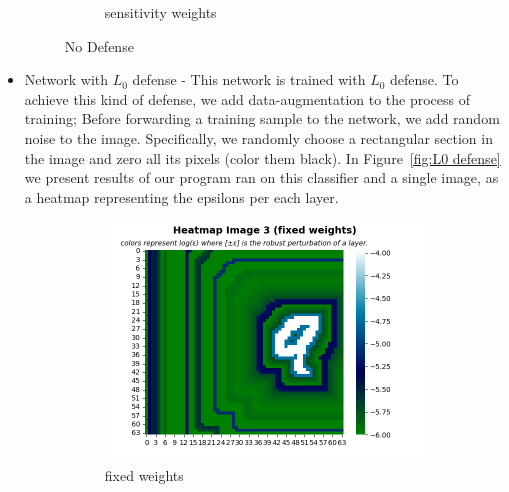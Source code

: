 \begin{itemize}
\begin{figure}
\begin{subfigure}[b]{0.4\textwidth}
             \caption{sensitivity weights}
             \label{sub-fig:No defense SW}
         \end{subfigure}
         \caption{No Defense}
         \label{fig:No defense}
     \end{figure}
    \item Network with $L_0$ defense - This network is trained with $L_0$ defense.
    To achieve this kind of defense, we add data-augmentation to the process of training;
    Before forwarding a training sample to the network, we add random noise to the image.
    Specifically, we randomly choose a rectangular section in the image and zero all its pixels (color them black).
    In Figure~\ref{fig:L0 defense} we present results of our program ran on this classifier and a single image, as a heatmap representing the epsilons per each layer.
    \begin{figure}
         \centering
         \begin{subfigure}[b]{0.4\textwidth}
             \centering
             \includegraphics[width=\textwidth]{l0_defense_fixed_weights.png}
             \caption{fixed weights}
             \label{sub-fig:L0 defense FW}
         \end{subfigure}
         \hfill
         \begin{subfigure}[b]{0.4\textwidth}
             \centering

\end{subfigure}
\end{figure}
\end{itemize}
